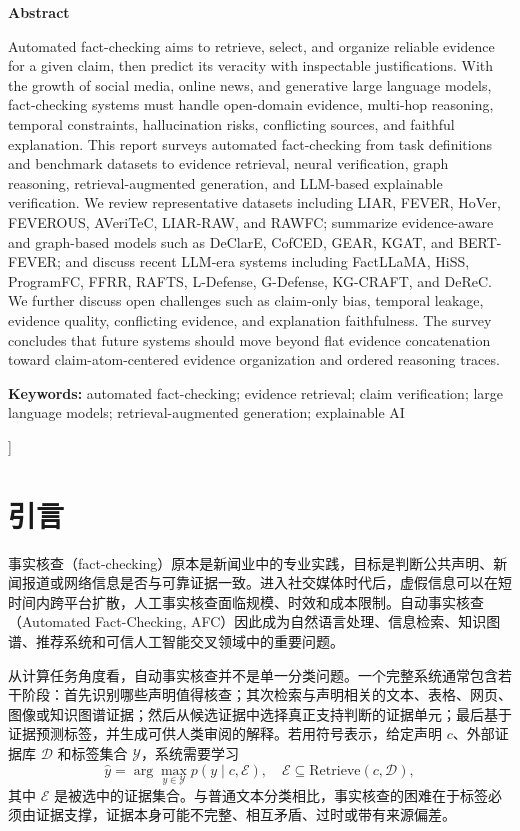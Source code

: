 \documentclass[UTF8,a4paper,zihao=5,twocolumn]{ctexart}
\begin{document}
{\begin{center}
{\bfseries{} Abstract}
\end{center}
{\rmfamily
Automated fact-checking aims to retrieve, select, and organize reliable evidence for a given claim, then predict its veracity with inspectable justifications. With the growth of social media, online news, and generative large language models, fact-checking systems must handle open-domain evidence, multi-hop reasoning, temporal constraints, hallucination risks, conflicting sources, and faithful explanation. This report surveys automated fact-checking from task definitions and benchmark datasets to evidence retrieval, neural verification, graph reasoning, retrieval-augmented generation, and LLM-based explainable verification. We review representative datasets including LIAR, FEVER, HoVer, FEVEROUS, AVeriTeC, LIAR-RAW, and RAWFC; summarize evidence-aware and graph-based models such as DeClarE, CofCED, GEAR, KGAT, and BERT-FEVER; and discuss recent LLM-era systems including FactLLaMA, HiSS, ProgramFC, FFRR, RAFTS, L-Defense, G-Defense, KG-CRAFT, and DeReC. We further discuss open challenges such as claim-only bias, temporal leakage, evidence quality, conflicting evidence, and explanation faithfulness. The survey concludes that future systems should move beyond flat evidence concatenation toward claim-atom-centered evidence organization and ordered reasoning traces.
\par}
\vspace{0.5em}
{\rmfamily\noindent\textbf{Keywords:} automated fact-checking; evidence retrieval; claim verification; large language models; retrieval-augmented generation; explainable AI}
\vspace{1.0em}
}]

\section{引言}

事实核查（fact-checking）原本是新闻业中的专业实践，目标是判断公共声明、新闻报道或网络信息是否与可靠证据一致。进入社交媒体时代后，虚假信息可以在短时间内跨平台扩散，人工事实核查面临规模、时效和成本限制。自动事实核查（Automated Fact-Checking, AFC）因此成为自然语言处理、信息检索、知识图谱、推荐系统和可信人工智能交叉领域中的重要问题\cite{Nakov2021Assisting,Guo2021Survey,Dmonte2024LLMSurvey}。

从计算任务角度看，自动事实核查并不是单一分类问题。一个完整系统通常包含若干阶段：首先识别哪些声明值得核查；其次检索与声明相关的文本、表格、网页、图像或知识图谱证据；然后从候选证据中选择真正支持判断的证据单元；最后基于证据预测标签，并生成可供人类审阅的解释。若用符号表示，给定声明 $c$、外部证据库 $\mathcal{D}$ 和标签集合 $\mathcal{Y}$，系统需要学习
\begin{equation}
\hat{y}=\arg\max_{y\in\mathcal{Y}}p(y\mid c,\mathcal{E}),
\quad
\mathcal{E}\subseteq \mathrm{Retrieve}(c,\mathcal{D}),
\end{equation}
其中 $\mathcal{E}$ 是被选中的证据集合。与普通文本分类相比，事实核查的困难在于标签必须由证据支撑，证据本身可能不完整、相互矛盾、过时或带有来源偏差。
\end{document}
